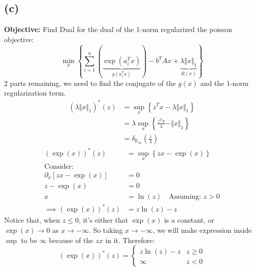 \documentclass[]{article}
\begin{document}
    \subsection*{(c)}
        \textbf{Objective: }Find Dual for the dual of the 1-norm regularized the poisson objective: 
        $$
        \min_x \left\lbrace
            \sum_{i=1}^{n}\left(
                \underbrace{\exp(a_i^Tx)}_{g(a_i^Tx)}
            \right) - b^TAx 
            + 
            \underbrace{\lambda \Vert x\Vert_1}_{R(x)}
        \right\rbrace
        $$
        2 parts remaining, we need to find the conjugate of the $g(x)$ and the 1-norm regularization term. 
        \begin{align*}\tag{4c1}\label{eqn:4c1}
            (\lambda \Vert x\Vert_1)^*(z) &= \sup_x \left\lbrace
                z^Tx - \lambda \Vert x\Vert_1
            \right\rbrace
            \\
            &= \lambda \sup_x \left\lbrace
                \frac{z^Tx}{\lambda} - \Vert x\Vert_1
            \right\rbrace
            \\
            &= \delta_{\mathbb{B}_\infty}
            \left(
                \frac{z}{\lambda}    
            \right)    
        \end{align*}
        \begin{align*}\tag{4c2}\label{eqn:4c2}
            (\exp(x))^*(z) &= \sup_x \left\lbrace
                zx - \exp(x)
            \right\rbrace
            \\
            \text{Consider: }&
            \\
            \partial_x [zx - \exp(x)] &= 0 
            \\
            z - \exp(x) &= 0 
            \\
            x &= \ln(z) \quad \text{Assuming: } z > 0
            \\
            \implies 
            (\exp(x))^*(z) &= z\ln(z) - z
        \end{align*}
        Notice that, when $z \le 0$, it's either that $\exp(x)$ is a constant, or $\exp(x)\rightarrow 0$ as $x\rightarrow -\infty$. So taking $x\rightarrow -\infty$, we will make expression inside $\sup$ to be $\infty$ because of the $zx$ in it. 
        Therefore: 
        \begin{equation*}\tag{4c3}\label{eqn:4c3}
            (\exp(x))^*(z) = 
            \begin{cases}
                z\ln(z) - z & z \ge 0
                \\
                \infty  & z < 0
            \end{cases}
        \end{equation*}
\end{document}
